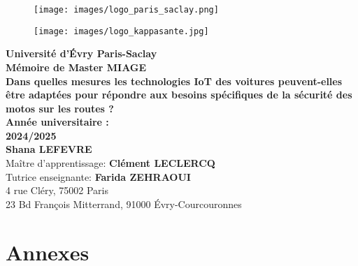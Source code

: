 \documentclass{article}
\begin{document}
\begin{titlepage}
    \begin{center}
        
        \begin{figure}[H]
            \centering
            \begin{minipage}[c]{0.45\textwidth}
                \centering
                \texttt{[image: images/logo\_paris\_saclay.png]}
            \end{minipage}
            \hfill
            \begin{minipage}[c]{0.45\textwidth}
                \centering
                \texttt{[image: images/logo\_kappasante.jpg]}
            \end{minipage}
        \end{figure}
   

        {\Large \textbf{Université d'Évry Paris-Saclay}}\\[0.5cm]
        {\Large \textbf{Mémoire de Master MIAGE}}\\[2cm]

        {\huge \textbf{Dans quelles mesures les technologies IoT des voitures peuvent-elles être adaptées pour répondre aux besoins spécifiques de la sécurité des motos sur les routes ? }}\\[1cm]
        {\Large\textbf{Année universitaire :}} \\[0.5cm]
        {\Large \textbf{2024/2025}}\\[1cm]
        {\Large \textbf{Shana LEFEVRE}}\\[2cm]
        {\Large Maître d'apprentissage: \textbf{Clément LECLERCQ}}\\[0.5cm]
        {\Large Tutrice enseignante: \textbf{Farida ZEHRAOUI}}\\[3cm]
        {\Large{4 rue Cléry, 75002 Paris}} \\
        {\Large{23 Bd François Mitterrand, 91000 Évry-Courcouronnes}} \\[0.5cm]
    \end{center}
\end{titlepage}


\tableofcontents %

\newpage

\newpage

\newpage

\newpage

\newpage

\newpage
 
\newpage
\printbibliography
{}

\newpage
\appendix
\section*{Annexes}
\end{document}
